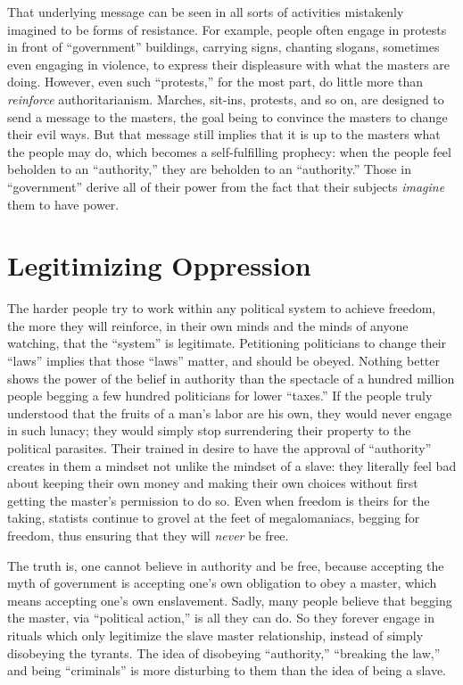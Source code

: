 \documentclass{book}
\begin{document}
That underlying message can be seen in all sorts of activities mistakenly imagined to be forms of resistance. For example, people often engage in protests in front of \enquote{government} buildings, carrying signs, chanting slogans, sometimes even engaging in violence, to express their displeasure with what the masters are doing. However, even such \enquote{protests,} for the most part, do little more than \emph{reinforce} authoritarianism. Marches, sit-ins, protests, and so on, are designed to send a message to the masters, the goal being to convince the masters to change their evil ways. But that message still implies that it is up to the masters what the people may do, which becomes a self-fulfilling prophecy: when the people feel beholden to an \enquote{authority,} they are beholden to an \enquote{authority.} Those in \enquote{government} derive all of their power from the fact that their subjects \emph{imagine} them to have power.

\section{Legitimizing Oppression}

The harder people try to work within any political system to achieve freedom, the more they will reinforce, in their own minds and the minds of anyone watching, that the \enquote{system} is legitimate. Petitioning politicians to change their \enquote{laws} implies that those \enquote{laws} matter, and should be obeyed. Nothing better shows the power of the belief in authority than the spectacle of a hundred million people begging a few hundred politicians for lower \enquote{taxes.} If the people truly understood that the fruits of a man's labor are his own, they would never engage in such lunacy; they would simply stop surrendering their property to the political parasites. Their trained in desire to have the approval of \enquote{authority} creates in them a mindset not unlike the mindset of a slave: they literally feel bad about keeping their own money and making their own choices without first getting the master's permission to do so. Even when freedom is theirs for the taking, statists continue to grovel at the feet of megalomaniacs, begging for freedom, thus ensuring that they will \emph{never} be free.

The truth is, one cannot believe in authority and be free, because accepting the myth of government is accepting one's own obligation to obey a master, which means accepting one's own enslavement. Sadly, many people believe that begging the master, via \enquote{political action,} is all they can do. So they forever engage in rituals which only legitimize the slave master relationship, instead of simply disobeying the tyrants. The idea of disobeying \enquote{authority,} \enquote{breaking the law,} and being \enquote{criminals} is more disturbing to them than the idea of being a slave.
\end{document}

